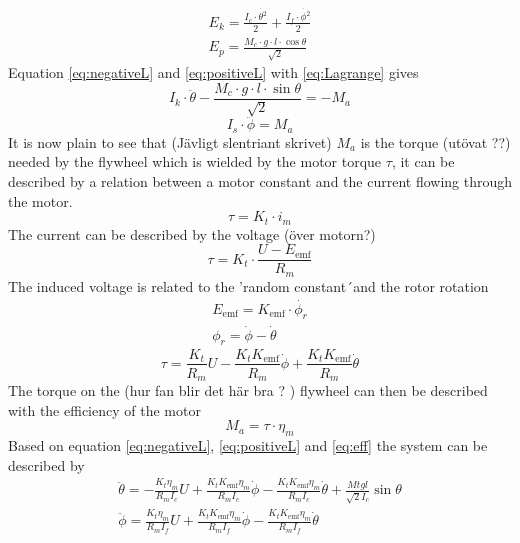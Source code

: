 \documentclass[a4paper,11pt]{kth-mag}
\begin{document}
\begin{align}
E_k = \frac{I_c \cdot \dot{\theta^2}}{2} + \frac{I_f \cdot \dot{\phi^2} }{2} \\
E_p = \frac{M_c \cdot g \cdot l \cdot \cos \theta}{\sqrt{2}} 
\end{align}
Equation \eqref{eq:negativeL} and \eqref{eq:positiveL} with \eqref{eq:Lagrange} gives
\begin{equation} \label{eq:negativeL2}
I_k \cdot \ddot{\theta} - \frac{M_c \cdot g \cdot l \cdot \sin \theta }{\sqrt{2}}  = -M_a
\end{equation}
\begin{equation} \label{eq:postiveL2}
I_s \cdot \ddot{\phi} = M_a
\end{equation}
It is now plain to see that (Jävligt slentriant skrivet) $M_a$ is the torque (utövat ??) needed by the flywheel which is wielded by the motor torque $\tau$, it can be described by a relation between a motor constant and the current flowing through the motor.
\begin{equation}
\tau = K_t \cdot i_m
\end{equation}
The current can be described by the voltage (över motorn?)
\begin{equation}
\tau = K_t \cdot \frac{U-E_{\text{emf}} }{R_m}
\end{equation}
The induced voltage is related to the 'random constant´and the rotor rotation
\begin{align}
E_{\text{emf}} = K_{\text{emf}} \cdot \dot{\phi_r} \\
\phi_r = \dot{\phi} - \dot{\theta} 
\end{align}
\begin{equation} \label{eq:tau}
\tau = \frac{K_t}{R_m} U - \frac{K_t K_{\text{emf}} }{R_m} \dot{\phi} + \frac{K_t K_{\text{emf}} }{R_m} \dot{\theta}
\end{equation}
The torque on the (hur fan blir det här bra ? ) flywheel can then be described with the efficiency of the motor
\begin{equation} \label{eq:eff}
M_a = \tau \cdot \eta_m
\end{equation}
Based on equation \eqref{eq:negativeL}, \eqref{eq:positiveL} and \eqref{eq:eff} the system can be described by
\begin{align} 
\ddot{\theta} = -\frac{K_t \eta_m}{R_m I_c} U + \frac{K_t K_{\text{emf}} \eta_m}{R_m I_c} \dot{\phi} - \frac{K_t K_{\text{emf}} \eta_m}{R_m I_c} \dot{\theta} + \frac{Mt g l }{\sqrt{2} I_c} \sin \theta \label{thetadotdot}
\\
\ddot{\phi} = \frac{K_t \eta_m}{R_m I_f} U + \frac{K_t K_{\text{emf}} \eta_m}{R_m I_f} \dot{\phi} - \frac{K_t K_{\text{emf}} \eta_m}{R_m I_f} \dot{\theta} 
\label{phidotdot}
\end{align} 
\end{document}
